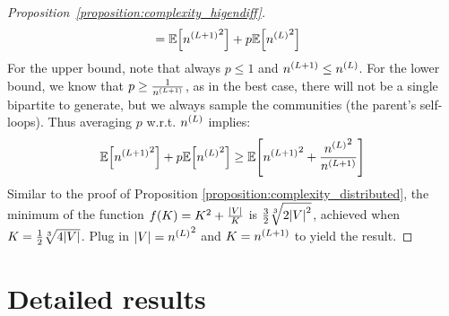 \begin{proof}[Proposition~\ref{proposition:complexity_higendiff}]
\begin{align}
\begin{split}
          &= \mathbb{E}\mathopen{}\left[{n^{\mathopen{}\left(L+1\right)}}^2\right] + p\mathbb{E}\mathopen{}\left[{n^{\mathopen{}\left(L\right)}}^2\right]
    \end{split}
\end{align}
For the upper bound, note that always $p \leq 1$ and $n^{\mathopen{}\left(L+1\right)} \leq n^{\mathopen{}\left(L\right)}$. For the lower bound, we know that $p \geq \frac{1}{n^{\mathopen{}\left(L+1\right)}}$, as in the best case, there will not be a single bipartite to generate, but we always sample the communities (the parent's self-loops). Thus averaging $p$ w.r.t. $n^{\mathopen{}\left(L\right)}$ implies: 
\begin{equation}
    \mathbb{E}\mathopen{}\left[{n^{\mathopen{}\left(L+1\right)}}^2\right] +p\mathbb{E}\mathopen{}\left[{n^{\mathopen{}\left(L\right)}}^2\right] \geq \mathbb{E}\mathopen{}\left[{n^{\mathopen{}\left(L+1\right)}}^2 + \frac{{n^{\mathopen{}\left(L\right)}}^2}{n^{\mathopen{}\left(L+1\right)}}\right]
\end{equation}
Similar to the proof of Proposition \ref{proposition:complexity_distributed}, the minimum of the function $f\mathopen{}\left(K\right)=K^2+\frac{\mathopen{}\left|V\right|}{K}$ is $\frac{3}{2}\sqrt[3]{2\mathopen{}\left|V\right|^2}$, achieved when $K=\frac{1}{2}\sqrt[3]{4\mathopen{}\left|V\right|}$. Plug in $\mathopen{}\left|V\right|={n^{\mathopen{}\left(L\right)}}^2$ and $K=n^{\mathopen{}\left(L+1\right)}$ to yield the result.
\end{proof}

\section{Detailed results}
\label{sec:appendix_higendiff_results}

